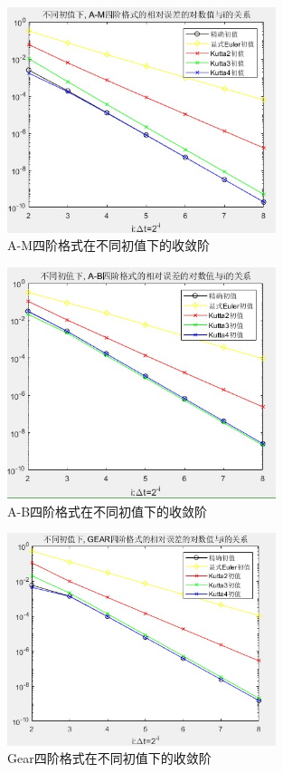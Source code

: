 \documentclass[12pt]{article}
\begin{document}
\begin{figure}[H]
	\centering
	\includegraphics[width=0.7\textwidth]{1}
	\caption{A-M四阶格式在不同初值下的收敛阶}
\end{figure}
\begin{figure}[H]
	\centering
	\includegraphics[width=0.7\textwidth]{2}
	\caption{A-B四阶格式在不同初值下的收敛阶}
\end{figure}
\begin{figure}[H]
	\centering
	\includegraphics[width=0.7\textwidth]{3}
	\caption{Gear四阶格式在不同初值下的收敛阶}
\end{figure}
\end{document}
